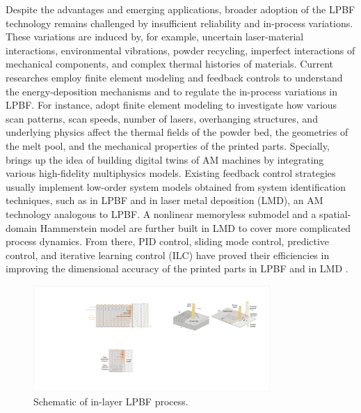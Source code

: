\documentclass [11pt, proquest] {uwthesis}[2020/02/24]
\begin{document}
Despite the advantages and emerging applications, broader adoption of the LPBF technology remains
challenged by insufficient reliability and in-process variations.
These variations are induced by, for example, uncertain laser-material
interactions, environmental vibrations, powder recycling, imperfect
interactions of mechanical components, and complex thermal histories
of materials\cite{wang2018multirate,kruth2007feedback,seyda2012investigation}. Current researches employ finite element modeling and feedback controls to understand the energy-deposition
mechanisms and to regulate the in-process variations in LPBF. For instance,
\cite{masoomi2017laser,hussein2013finite,foroozmehr2016finite,khairallah2016laser}
adopt finite element modeling to investigate how various scan patterns,
scan speeds, number of lasers, overhanging structures, and underlying
physics affect the thermal fields of the powder bed, the geometries
of the melt pool, and the mechanical properties of the printed parts.
Specially, \cite{debroy2017building} brings up the idea of building
digital twins of AM machines by integrating various high-fidelity
multiphysics models. Existing feedback control strategies usually
implement low-order system models obtained from system identification
techniques, such as \cite{kruth2007feedback,craeghs2010feedback,zheng2020distributed}
in LPBF and \cite{song2011feedback,cao2015control,sammons2014repetitive}
in laser metal deposition (LMD), an AM technology analogous to LPBF.
A nonlinear memoryless submodel \cite{fathi2008geometry,cao2015control}
and a spatial-domain Hammerstein model \cite{sammons2014repetitive}
are further built in LMD to cover more complicated process dynamics.
From there, PID control, sliding mode control, predictive control,
and iterative learning control (ILC) have proved their efficiencies in improving
the dimensional accuracy of the printed parts in LPBF \cite{kruth2007feedback,craeghs2010feedback,vlasea2015development,fleming2020tracking}
and in LMD \cite{hofman2012camera,salehi2006melt,fathi2007clad,fathi2008geometry,song2011feedback,tang2011layer}.
\begin{figure}[!ht]
\begin{centering}
\includegraphics[clip,width=9cm]{Closed-loop-simulation/SLS schematic diagram-2}
\par\end{centering}
\centering{}\caption{\label{fig:Schematic-of-in-layer}Schematic of in-layer LPBF process.}
\end{figure}
\end{document}
